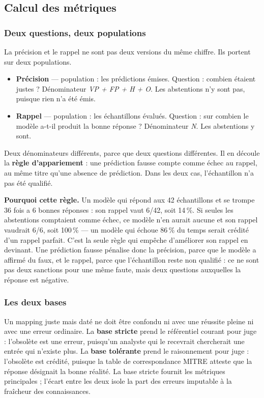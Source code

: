 \FloatBarrier
\subsection{Calcul des métriques}\label{sec:meth-metriques}

\subsubsection{Deux questions, deux populations}\label{sec:3-1}
La précision et le rappel ne sont pas deux versions du même chiffre. Ils portent sur deux populations.

\begin{itemize}
\item
  \textbf{Précision} --- population : les prédictions émises. Question : combien étaient justes ? Dénominateur \emph{VP + FP + H + O}. Les abstentions n'y sont pas, puisque rien n'a été émis.
\item
  \textbf{Rappel} --- population : les échantillons évalués. Question : sur combien le modèle a-t-il produit la bonne réponse ? Dénominateur \emph{N}. Les abstentions y sont.
\end{itemize}

Deux dénominateurs différents, parce que deux questions différentes. Il en découle la \textbf{règle d'appariement} : une prédiction fausse compte comme échec au rappel, au même titre qu'une absence de prédiction. Dans les deux cas, l'échantillon n'a pas été qualifié.

\textbf{Pourquoi cette règle.} Un modèle qui répond aux 42 échantillons et se trompe 36 fois a 6 bonnes réponses : son rappel vaut 6/42, soit 14\,\%. Si seules les abstentions comptaient comme échec, ce modèle n'en aurait aucune et son rappel vaudrait 6/6, soit 100\,\% --- un modèle qui échoue 86\,\% du temps serait crédité d'un rappel parfait. C'est la seule règle qui empêche d'améliorer son rappel en devinant. Une prédiction fausse pénalise donc la précision, parce que le modèle a affirmé du faux, et le rappel, parce que l'échantillon reste non qualifié : ce ne sont pas deux sanctions pour une même faute, mais deux questions auxquelles la réponse est négative.

\subsubsection{Les deux bases}\label{sec:3-2}
Un mapping juste mais daté ne doit être confondu ni avec une réussite pleine ni avec une erreur ordinaire. La \textbf{base stricte} prend le référentiel courant pour juge : l'obsolète est une erreur, puisqu'un analyste qui le recevrait chercherait une entrée qui n'existe plus. La \textbf{base tolérante} prend le raisonnement pour juge : l'obsolète est crédité, puisque la table de correspondance MITRE atteste que la réponse désignait la bonne réalité. La base stricte fournit les métriques principales ; l'écart entre les deux isole la part des erreurs imputable à la fraîcheur des connaissances.

